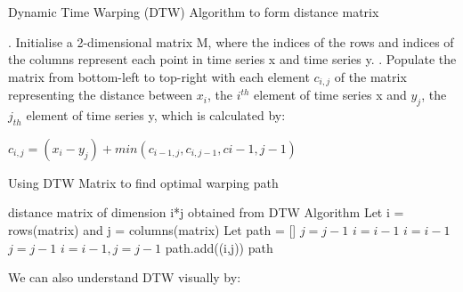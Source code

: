 \documentclass[nonblindrev,msom]{informs3} %
\begin{document}
\begin{algorithm}[H]
\caption{Dynamic Time Warping (DTW) Algorithm to form distance matrix}
\begin{algorithmic}
\STATE 
{}. Initialise a 2-dimensional matrix M, where the indices of the rows and indices of the columns represent each point in time series x and time series y. 
. Populate the matrix from bottom-left to top-right with each element $c_{i,j}$ of the matrix representing the distance between $x_i$, the $i^{th}$ element of time series x and $y_j$, the $j_{th}$ element of time series y, which is calculated by:

\begin{center}
$c_{i,j} = (x_i - y_j) + min(c_{i-1,j}, c_{i,j-1}, c{i-1,j-1})$
\end{center}

\end{algorithmic}
\end{algorithm}

\begin{algorithm}[H]
\caption{Using DTW Matrix to find optimal warping path}
\begin{algorithmic}
\REQUIRE distance matrix of dimension i*j obtained from DTW Algorithm
\STATE Let i = rows(matrix) and j = columns(matrix)
\STATE Let path = []
\STATE $j = j-1$
\STATE $i = i-1$
\ELSE
{}
\STATE $i = i - 1$
\STATE $j = j - 1$
\ELSE
\STATE $i = i - 1, j = j - 1$
\ENDIF
path.add((i,j))
\ENDIF
\ENDWHILE
\RETURN path
\end{algorithmic}
\end{algorithm}


\newpage
\noindent We can also understand DTW visually by:
\end{document}
